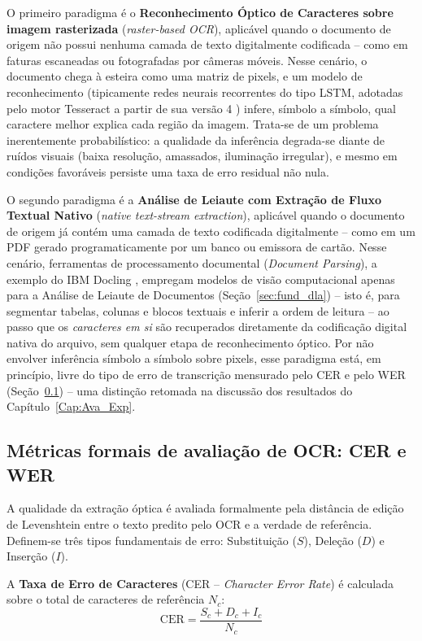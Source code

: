 O primeiro paradigma é o \textbf{Reconhecimento Óptico de Caracteres sobre imagem rasterizada} (\textit{raster-based OCR}), aplicável quando o documento de origem não possui nenhuma camada de texto digitalmente codificada -- como em faturas escaneadas ou fotografadas por câmeras móveis. Nesse cenário, o documento chega à esteira como uma matriz de pixels, e um modelo de reconhecimento (tipicamente redes neurais recorrentes do tipo LSTM, adotadas pelo motor Tesseract a partir de sua versão 4 \cite{smith2007overview, tesseract2024lstm}) infere, símbolo a símbolo, qual caractere melhor explica cada região da imagem. Trata-se de um problema inerentemente probabilístico: a qualidade da inferência degrada-se diante de ruídos visuais (baixa resolução, amassados, iluminação irregular), e mesmo em condições favoráveis persiste uma taxa de erro residual não nula.

O segundo paradigma é a \textbf{Análise de Leiaute com Extração de Fluxo Textual Nativo} (\textit{native text-stream extraction}), aplicável quando o documento de origem já contém uma camada de texto codificada digitalmente -- como em um PDF gerado programaticamente por um banco ou emissora de cartão. Nesse cenário, ferramentas de processamento documental (\textit{Document Parsing}), a exemplo do IBM Docling \cite{docling2024}, empregam modelos de visão computacional apenas para a Análise de Leiaute de Documentos (Seção~\ref{sec:fund_dla}) -- isto é, para segmentar tabelas, colunas e blocos textuais e inferir a ordem de leitura -- ao passo que os \textit{caracteres em si} são recuperados diretamente da codificação digital nativa do arquivo, sem qualquer etapa de reconhecimento óptico. Por não envolver inferência símbolo a símbolo sobre pixels, esse paradigma está, em princípio, livre do tipo de erro de transcrição mensurado pelo CER e pelo WER (Seção~\ref{sec:fund_metricas_ocr}) -- uma distinção retomada na discussão dos resultados do Capítulo~\ref{Cap:Ava_Exp}.

\subsection{Métricas formais de avaliação de OCR: CER e WER}
\label{sec:fund_metricas_ocr}
A qualidade da extração óptica é avaliada formalmente pela distância de edição de Levenshtein \cite{levenshtein1966binary} entre o texto predito pelo OCR e a verdade de referência. Definem-se três tipos fundamentais de erro: Substituição ($S$), Deleção ($D$) e Inserção ($I$).

A \textbf{Taxa de Erro de Caracteres} (CER -- \textit{Character Error Rate}) é calculada sobre o total de caracteres de referência $N_c$:
\begin{equation}
	\text{CER} = \frac{S_c + D_c + I_c}{N_c}
\end{equation}

